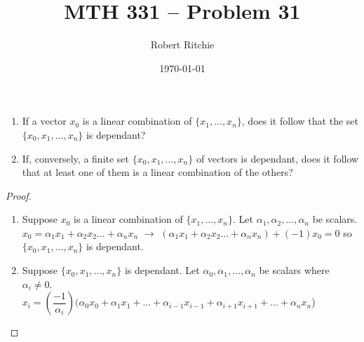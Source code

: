 \documentclass[11pt]{article}
\begin{document}
\author{Robert Ritchie}
\title{MTH 331 -- Problem 31}
\date{\today}

\maketitle

\begin{enumerate}

\item If a vector $x_{0}$ is a linear combination of $\{x_{1},...,x_{n}\}$, does it follow that the set $\{x_{0},x_{1},...,x_{n}\}$ is dependant?
\item If, conversely, a finite set $\{x_{0},x_{1},...,x_{n}\}$ of vectors is dependant, does it follow that at least one of them is a linear combination of the others?

\end{enumerate}
\begin{proof} 
\begin{enumerate}
\item Suppose $x_{0}$ is a linear combination of $\{x_{1},...,x_{n}\}$.
Let $\alpha_{1},\alpha_{2},...,\alpha_{n}$ be scalars. \\
$x_{0}=\alpha_{1}x_{1}+\alpha_{2}x_{2}...+\alpha_{n}x_{n}$ $\rightarrow$
$(\alpha_{1} x_{1} +\alpha_{2} x_{2} ...+\alpha_{n} x_{n} ) + (-1)x_{0}=0$ so $\{x_{0},x_{1},...,x_{n}\}$ is dependant.
\item Suppose $\{x_{0},x_{1},...,x_{n}\}$ is dependant. Let $\alpha_{0},\alpha_{1},...,\alpha_{n}$ be scalars where $\alpha_{i}\neq0$. \\
$x_{i}=(\dfrac{-1}{\alpha_{i}})(\alpha_{0}x_{0}+\alpha_{1}x_{1}+...+\alpha_{i-1}x_{i-1}+\alpha_{i+1}x_{i+1}+...+\alpha_{n}x_{n}$)
\end{enumerate}


\end{proof}
\end{document}
